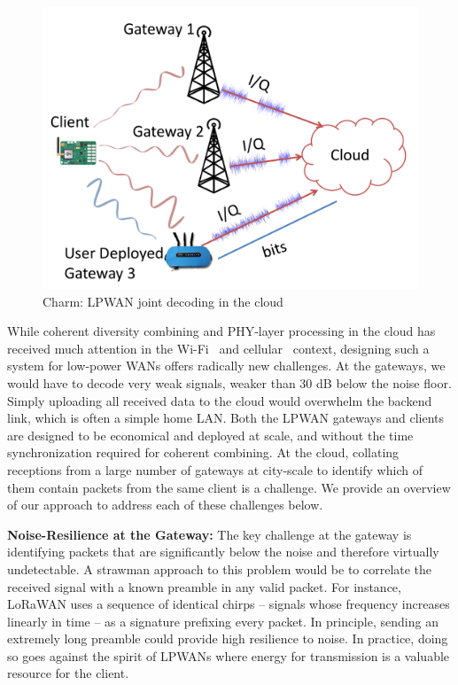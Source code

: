 \begin{figure}
    \centering
    \includegraphics[width=0.60\columnwidth]{figures/LoRaRAN.pdf}
        \vspace*{-0.1in}
    \caption{Charm: LPWAN joint decoding in the cloud}
    \vspace*{-0.1in}
    \label{fig:my_label}
    \compactimg
\end{figure}

While coherent diversity combining and PHY-layer processing in the cloud has
received much attention in the Wi-Fi~\cite{tan2009sam, xie2014scalable} and
cellular~\cite{checko2015cloud, wubben2014benefits} context, designing such a
system for low-power WANs offers radically new challenges. At the gateways, we
would have to decode very weak signals, weaker than 30 dB below the noise
floor. Simply uploading all received data to the cloud would overwhelm
the backend link, which is often  a simple home LAN. Both the LPWAN gateways
and clients are designed to be economical and deployed at scale, and without
the time synchronization required for coherent combining. At the cloud,
collating receptions from a large number of gateways at city-scale to identify
which of them contain packets from the same client is a challenge. We provide
an overview of our approach to address each of these challenges below.

\noindent \textbf{Noise-Resilience at the Gateway:} The key challenge at the
gateway is identifying packets that are significantly below the noise and
therefore virtually undetectable. A strawman approach to this problem would be
to correlate the received signal with a known preamble in any valid packet.
For instance, LoRaWAN uses a sequence of identical chirps -- signals whose
frequency increases linearly in time -- as a signature prefixing every packet.
In principle, sending an extremely long preamble could provide high resilience
to noise. In practice, doing so goes against the spirit of LPWANs where
energy for transmission is a valuable resource for the client.

